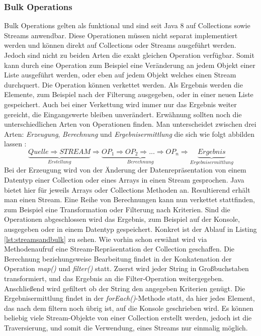 \subsubsection{Bulk Operations}
Bulk Operations gelten als funktional und sind seit Java 8 auf Collections sowie Streams anwendbar. Diese Operationen müssen nicht separat implementiert werden und können direkt auf Collections oder Streams ausgeführt werden. Jedoch sind nicht zu beiden Arten die exakt gleichen Operation verfügbar. Somit kann durch eine Operation zum Beispiel eine Veränderung an jedem Objekt einer Liste ausgeführt werden, oder eben auf jedem Objekt welches einen Stream durchquert. Die Operation können verkettet werden. Als Ergebnis werden die Elemente, zum Beispiel nach der Filterung ausgegeben, oder in einer neuen Liste gespeichert. Auch bei einer Verkettung wird immer nur das Ergebnis weiter gereicht, die Eingangswerte bleiben unverändert. Erwähnung sollten noch die unterschiedlichen Arten von Operationen finden. Man unterscheidet zwischen drei Arten: \textit{Erzeugung}, \textit{Berechnung} und \textit{Ergebnisermittlung} die sich wie folgt abbilden lassen \cite{Inden.2015} : 
\begin{displaymath}
\underbrace{Quelle \Rightarrow STREAM}_{Erstellung} \Rightarrow \underbrace{OP_{1} \Rightarrow OP_{2} \Rightarrow ... \Rightarrow OP_{n}}_{Berechnung} \Rightarrow \underbrace{Ergebnis}_{Ergebnisermittlung}
\end{displaymath}
Bei der Erzeugung wird von der Änderung der Datenrepräsentation von einem Datentyp einer Collection oder eines Arrays in einen Stream gesprochen. Java bietet hier für jeweils Arrays oder Collections Methoden an. Resultierend erhält man einen Stream. Eine Reihe von Berechnungen kann nun verkettet stattfinden, zum Beispiel eine Transformation oder Filterung nach Kriterien. Sind die Operationen abgeschlossen wird das Ergebnis, zum Beispiel auf der Konsole, ausgegeben oder in einem Datentyp gespeichert. Konkret ist der Ablauf in Listing \ref{lst:streamsandbulk} zu sehen. Wie vorhin schon erwähnt wird via Methodenaufruf eine Stream-Repräsentation der Collection geschaffen. Die Berechnung beziehungsweise Bearbeitung findet in der Konkatenation der Operation \textit{map()} und \textit{filter()} statt. Zuerst wird jeder String in Großbuchstaben transformiert, und das Ergebnis an die Filter-Operation weitergegeben. Anschließend wird gefiltert ob der String den angegeben Kriterien genügt. Die Ergebnisermittlung findet in der \textit{forEach()}-Methode statt, da hier jedes Element, das nach dem filtern noch übrig ist, auf die Konsole geschrieben wird. Es können beliebig viele Stream-Objekte von einer Collection erstellt werden, jedoch ist die Traversierung, und somit die Verwendung, eines Streams nur einmalig möglich.
